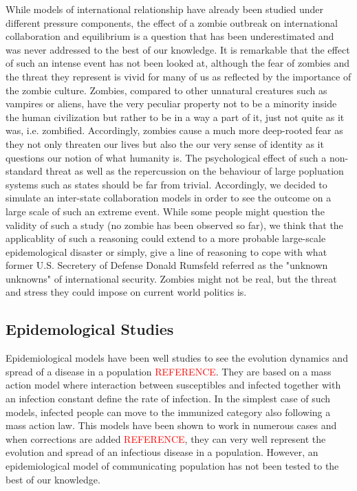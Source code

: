 \documentclass[11pt]{article} %
\begin{document}
While models of international relationship have already been studied under different pressure components, the effect of a zombie outbreak on international collaboration and equilibrium is a question that has been underestimated and was never addressed to the best of our knowledge. It is remarkable that the effect of such an intense event has not been looked at, although the fear of zombies and the threat they represent is vivid for many of us as reflected by the importance of the zombie culture. Zombies, compared to other unnatural creatures such as vampires or aliens, have the very peculiar property not to be a minority inside the human civilization but rather to be in a way a part of it, just not quite as it was, i.e. zombified. Accordingly, zombies cause a much more deep-rooted fear as they not only threaten our lives but also the our very sense of identity as it questions our notion of what humanity is. The psychological effect of such a non-standard threat as well as the repercussion on the behaviour of large popluation systems such as states should be far from trivial. Accordingly, we decided to simulate an inter-state collaboration models in order to see the outcome on a large scale of such an extreme event. While some people might question the validity of such a study (no zombie has been observed so far), we think that the applicablity of such a reasoning could extend to a more probable large-scale epidemological disaster or simply, give a line of reasoning to cope with what former U.S. Secretery of Defense Donald Rumsfeld referred as the "unknown unknowns" of international security. Zombies might not be real, but the threat and stress they could impose on current world politics is. \\

\subsection{Epidemological Studies}\indent

Epidemiological models have been well studies to see the evolution dynamics and spread of a disease in a population \textcolor{red}{REFERENCE}. They are based on a mass action model where interaction between susceptibles and infected together with an infection constant define the rate of infection. In the simplest case of such models, infected people can move to the immunized category also following a mass action law. This models have been shown to work in numerous cases and  when corrections are added \textcolor{red}{REFERENCE}, they can very well represent the evolution and spread of an infectious disease in a population. However, an epidemiological model of communicating population has not been tested to the best of our knowledge. \\
\end{document}
